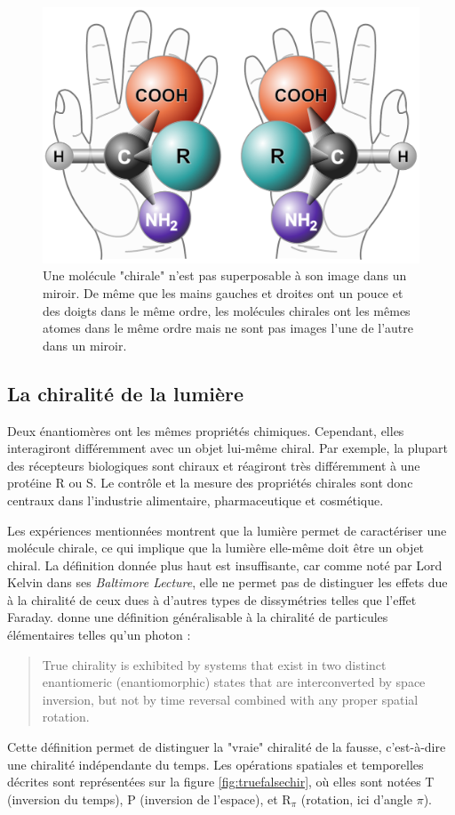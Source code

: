 \begin{figure}[!ht]
\centering
\includegraphics[width=.5\columnwidth]{Figures/Chirality/chirality_with_hands.pdf}%
\caption{Une molécule "chirale" n'est pas superposable à son image dans un miroir. De même que les mains gauches et droites ont un pouce et des doigts dans le même ordre, les molécules chirales ont les mêmes atomes dans le même ordre mais ne sont pas images l'une de l'autre dans un miroir.}
\label{fig:chirality}
\end{figure}

\subsection{La chiralité de la lumière}
Deux énantiomères ont les mêmes propriétés chimiques. Cependant, elles interagiront différemment avec un objet lui-même chiral. Par exemple, la plupart des récepteurs biologiques sont chiraux et réagiront très différemment à une protéine R ou S. Le contrôle et la mesure des propriétés chirales sont donc centraux dans l'industrie alimentaire, pharmaceutique et cosmétique. 

Les expériences mentionnées montrent que la lumière permet de caractériser une molécule chirale, ce qui implique que la lumière elle-même doit être un objet chiral. La définition donnée plus haut est insuffisante, car comme noté par Lord Kelvin dans ses \textit{Baltimore Lecture}, elle ne permet pas de distinguer les effets due à la chiralité de ceux dues à d'autres types de dissymétries telles que l'effet Faraday.  donne une définition généralisable à la chiralité de particules élémentaires telles qu'un photon :

\begin{quotation}
True chirality is exhibited by systems that exist in two distinct enantiomeric (enantiomorphic) states that are interconverted by space inversion, but not by time reversal combined with any proper spatial rotation.
\end{quotation}

Cette définition permet de distinguer la "vraie" chiralité de la fausse, c'est-à-dire une chiralité indépendante du temps. Les opérations spatiales et temporelles décrites sont représentées sur la figure \ref{fig:truefalsechir}, où elles sont notées T (inversion du temps), P (inversion de l'espace), et $\text{R}_{\pi}$ (rotation, ici d'angle $\pi$). 

